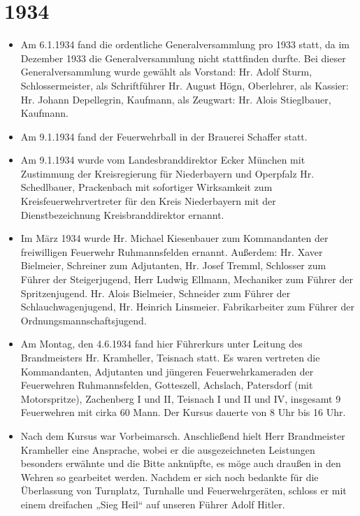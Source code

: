 \documentclass[12pt,a4paper]{book}
\begin{document}
\section*{1934}

\begin{itemize}
\item Am 6.1.1934 fand die ordentliche Generalversammlung pro 1933 statt, da im
Dezember 1933 die Generalversammlung nicht stattfinden durfte. Bei dieser
Generalversammlung wurde gewählt als Vorstand: Hr. Adolf Sturm,
Schlossermeister, als Schriftführer Hr. August Högn, Oberlehrer, als Kassier:
Hr. Johann Depellegrin, Kaufmann, als Zeugwart: Hr. Alois Stieglbauer, Kaufmann.

\item Am 9.1.1934 fand der Feuerwehrball in der Brauerei Schaffer statt.

\item Am 9.1.1934 wurde vom Landesbranddirektor Ecker München mit Zustimmung der
Kreisregierung für Niederbayern und Operpfalz Hr. Schedlbauer, Prackenbach mit
sofortiger Wirksamkeit zum Kreisfeuerwehrvertreter für den Kreis Niederbayern
mit der Dienstbezeichnung Kreisbranddirektor ernannt.

\item Im März 1934 wurde Hr. Michael Kiesenbauer zum Kommandanten der
freiwilligen Feuerwehr Ruhmannsfelden ernannt. Außerdem: Hr. Xaver Bielmeier,
Schreiner zum Adjutanten, Hr. Josef Tremml, Schlosser zum Führer der
Steigerjugend, Herr Ludwig Ellmann, Mechaniker zum Führer der Spritzenjugend.
Hr. Alois Bielmeier, Schneider zum Führer der Schlauchwagenjugend, Hr. Heinrich
Linsmeier. Fabrikarbeiter zum Führer der Ordnungsmannschaftsjugend.

\item Am Montag, den 4.6.1934 fand hier Führerkurs unter Leitung des
Brandmeisters Hr. Kramheller, Teisnach statt. Es waren vertreten die
Kommandanten, Adjutanten und jüngeren Feuerwehrkameraden der Feuerwehren
Ruhmannsfelden, Gotteszell, Achslach, Patersdorf (mit Motorspritze), Zachenberg
I und II, Teisnach I und II und IV, insgesamt 9 Feuerwehren mit cirka 60 Mann.
Der Kursus dauerte von 8 Uhr bis 16 Uhr.

\item Nach dem Kursus war Vorbeimarsch. Anschließend hielt Herr Brandmeister
Kramheller eine Ansprache, wobei er die ausgezeichneten Leistungen besonders
erwähnte und die Bitte anknüpfte, es möge auch draußen in den Wehren so
gearbeitet werden. Nachdem er sich noch bedankte für die Überlassung von
Turnplatz, Turnhalle und Feuerwehrgeräten, schloss er mit einem dreifachen „Sieg
Heil“ auf unseren Führer Adolf Hitler.


\end{itemize}
\end{document}
